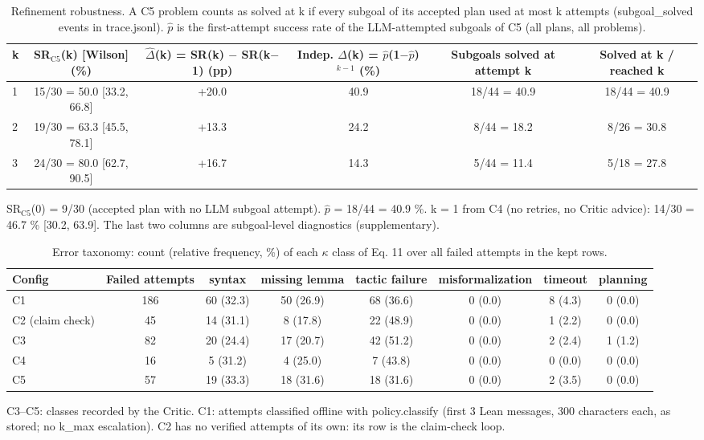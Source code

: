 \begin{table}[t]
\centering
\scriptsize
\setlength{\tabcolsep}{3pt}
\caption{Refinement robustness. A C5 problem counts as solved at k if every subgoal of its accepted plan used at most k attempts (subgoal\_solved events in trace.jsonl). $\hat p$ is the first-attempt success rate of the LLM-attempted subgoals of C5 (all plans, all problems).}
\label{tab:srk}
\begin{tabular}{lccccc}
\toprule
k & SR$_{\mathrm{C5}}$(k) {[}Wilson{]} (\%) & $\hat\Delta$(k) = SR(k) $-$ SR(k$-$1) (pp) & Indep. $\Delta$(k) = $\hat p$(1$-\hat p$)$^{k-1}$ (\%) & Subgoals solved at attempt k & Solved at k / reached k \\
\midrule
1 & 15/30 = 50.0 {[}33.2, 66.8{]} & +20.0 & 40.9 & 18/44 = 40.9 & 18/44 = 40.9 \\
2 & 19/30 = 63.3 {[}45.5, 78.1{]} & +13.3 & 24.2 & 8/44 = 18.2 & 8/26 = 30.8 \\
3 & 24/30 = 80.0 {[}62.7, 90.5{]} & +16.7 & 14.3 & 5/44 = 11.4 & 5/18 = 27.8 \\
\bottomrule
\end{tabular}

\vspace{2pt}
\parbox{\linewidth}{\scriptsize SR$_{\mathrm{C5}}$(0) = 9/30 (accepted plan with no LLM subgoal attempt). $\hat p$ = 18/44 = 40.9 \%. k = 1 from C4 (no retries, no Critic advice): 14/30 = 46.7 \% {[}30.2, 63.9{]}. The last two columns are subgoal-level diagnostics (supplementary).}
\end{table}

\begin{table}[t]
\centering
\scriptsize
\setlength{\tabcolsep}{3pt}
\caption{Error taxonomy: count (relative frequency, \%) of each $\kappa$ class of Eq. 11 over all failed attempts in the kept rows.}
\label{tab:kappa}
\begin{tabular}{lccccccc}
\toprule
Config & Failed attempts & syntax & missing lemma & tactic failure & misformalization & timeout & planning \\
\midrule
C1 & 186 & 60 (32.3) & 50 (26.9) & 68 (36.6) & 0 (0.0) & 8 (4.3) & 0 (0.0) \\
C2 (claim check) & 45 & 14 (31.1) & 8 (17.8) & 22 (48.9) & 0 (0.0) & 1 (2.2) & 0 (0.0) \\
C3 & 82 & 20 (24.4) & 17 (20.7) & 42 (51.2) & 0 (0.0) & 2 (2.4) & 1 (1.2) \\
C4 & 16 & 5 (31.2) & 4 (25.0) & 7 (43.8) & 0 (0.0) & 0 (0.0) & 0 (0.0) \\
C5 & 57 & 19 (33.3) & 18 (31.6) & 18 (31.6) & 0 (0.0) & 2 (3.5) & 0 (0.0) \\
\bottomrule
\end{tabular}

\vspace{2pt}
\parbox{\linewidth}{\scriptsize C3--C5: classes recorded by the Critic. C1: attempts classified offline with policy.classify (first 3 Lean messages, 300 characters each, as stored; no k\_max escalation). C2 has no verified attempts of its own: its row is the claim-check loop.}
\end{table}

